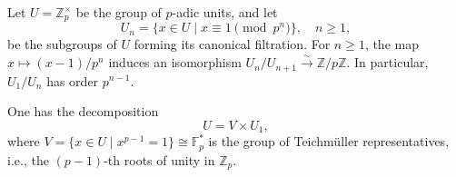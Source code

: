 Let $U = \mathbb{Z}_p^\times$ be the group of $p$-adic units, and let
$$U_n = \{x \in U \mid x \equiv 1 \pmod{p^n}\}, \quad n \geq 1,$$
be the subgroups of $U$ forming its canonical filtration. For $n \geq 1$, the map $x \mapsto (x-1)/p^n$ induces an isomorphism $U_n/U_{n+1} \xrightarrow{\sim} \mathbb{Z}/p\mathbb{Z}$. In particular, $U_1/U_n$ has order $p^{n-1}$.

One has the decomposition
$$U = V \times U_1,$$
where $V = \{x \in U \mid x^{p-1} = 1\} \cong \mathbb{F}_p^*$ is the group of Teichm\"uller representatives, i.e., the $(p-1)$-th roots of unity in $\mathbb{Z}_p$.
